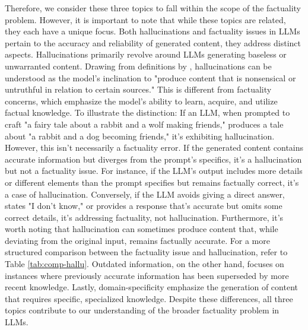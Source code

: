 Therefore, we consider these three topics to fall within the scope of the factuality problem.
However, it is important to note that while these topics are related, they each have a unique focus. 
Both hallucinations and factuality issues in LLMs pertain to the accuracy and reliability of generated content, they address distinct aspects. Hallucinations primarily revolve around LLMs generating baseless or unwarranted content. Drawing from definitions by \citet{GPT4,Hallucination_Survey}, hallucinations can be understood as the model's inclination to "produce content that is nonsensical or untruthful in relation to certain sources." This is different from factuality concerns, which emphasize the model's ability to learn, acquire, and utilize factual knowledge.
To illustrate the distinction:
If an LLM, when prompted to craft "a fairy tale about a rabbit and a wolf making friends," produces a tale about "a rabbit and a dog becoming friends," it's exhibiting hallucination. However, this isn't necessarily a factuality error.
If the generated content contains accurate information but diverges from the prompt's specifics, it's a hallucination but not a factuality issue. For instance, if the LLM's output includes more details or different elements than the prompt specifies but remains factually correct, it's a case of hallucination.
Conversely, if the LLM avoids giving a direct answer, states "I don't know," or provides a response that's accurate but omits some correct details, it's addressing factuality, not hallucination.
Furthermore, it's worth noting that hallucination can sometimes produce content that, while deviating from the original input, remains factually accurate.
For a more structured comparison between the factuality issue and hallucination, refer to Table \ref{tab:comp-hallu}.
Outdated information, on the other hand, focuses on instances where previously accurate information has been superseded by more recent knowledge. Lastly, domain-specificity emphasize the generation of content that requires specific, specialized knowledge. Despite these differences, all three topics contribute to our understanding of the broader factuality problem in LLMs.

 
